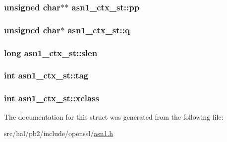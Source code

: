 \subsubsection[{\texorpdfstring{pp}{pp}}]{\setlength{\rightskip}{0pt plus 5cm}unsigned char$\ast$$\ast$ asn1\+\_\+ctx\+\_\+st\+::pp}\hypertarget{structasn1__ctx__st_a1f8419ae235a22405868d87136f3b098}{}\label{structasn1__ctx__st_a1f8419ae235a22405868d87136f3b098}
\subsubsection[{\texorpdfstring{q}{q}}]{\setlength{\rightskip}{0pt plus 5cm}unsigned char$\ast$ asn1\+\_\+ctx\+\_\+st\+::q}\hypertarget{structasn1__ctx__st_a2b0e6ae963399039db4a27f09ade7e41}{}\label{structasn1__ctx__st_a2b0e6ae963399039db4a27f09ade7e41}
\subsubsection[{\texorpdfstring{slen}{slen}}]{\setlength{\rightskip}{0pt plus 5cm}long asn1\+\_\+ctx\+\_\+st\+::slen}\hypertarget{structasn1__ctx__st_ae23813e92662ef3caff611c92fe51879}{}\label{structasn1__ctx__st_ae23813e92662ef3caff611c92fe51879}
\subsubsection[{\texorpdfstring{tag}{tag}}]{\setlength{\rightskip}{0pt plus 5cm}int asn1\+\_\+ctx\+\_\+st\+::tag}\hypertarget{structasn1__ctx__st_a50c207efa22cdc9e926f70c3e05ebd8b}{}\label{structasn1__ctx__st_a50c207efa22cdc9e926f70c3e05ebd8b}
\subsubsection[{\texorpdfstring{xclass}{xclass}}]{\setlength{\rightskip}{0pt plus 5cm}int asn1\+\_\+ctx\+\_\+st\+::xclass}\hypertarget{structasn1__ctx__st_a13d5a9bd152573c46b088acac3f7671f}{}\label{structasn1__ctx__st_a13d5a9bd152573c46b088acac3f7671f}


The documentation for this struct was generated from the following file\+:\begin{DoxyCompactItemize}
\item 
src/hal/pb2/include/openssl/\hyperlink{asn1_8h}{asn1.\+h}\end{DoxyCompactItemize}
